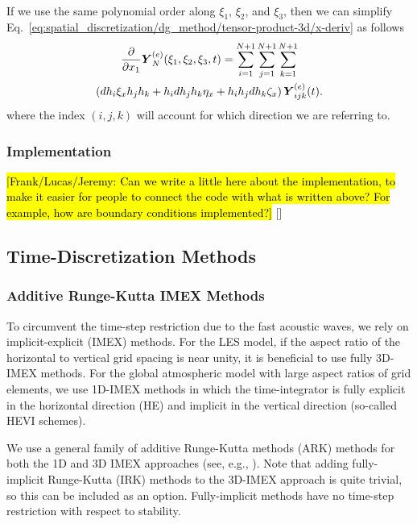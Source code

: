 \documentclass{article}
\begin{document}
{\begin{multline}
\label{eq:spatial_discretization/dg_method/tensor-product-3d/x-deriv}
\end{multline}
If we use the same polynomial order along $\xi_{1}$, $\xi_{2}$, and $\xi_{3}$, then we can simplify Eq.\ \eqref{eq:spatial_discretization/dg_method/tensor-product-3d/x-deriv} as follows
\begin{multline}
\frac{\partial }{\partial x_{1}} \boldsymbol{{Y}}^{(e)}_N(\xi_{1}, \xi_{2}, \xi_{3}, t) = \sum_{i=1}^{N+1} \sum_{j=1}^{N+1} \sum_{k=1}^{N+1} \\
\left( dh_i \xi_x h_j h_k + h_i dh_j h_k \eta_x + h_i h_j dh_k \zeta_x\right) \boldsymbol{{Y}}^{(e)}_{ijk}(t).
\label{eq:spatial_discretization/dg_method/tensor-product-3d/x-deriv2}
\end{multline}
where the index $(i,j,k)$ will account for which direction we are referring to.

\subsubsection{Implementation}

\hl{[Frank/Lucas/Jeremy: Can we write a little here about the implementation, to make it easier for people to connect the code with what is written above? For example, how are boundary conditions implemented?]} 
[]

\subsection{Time-Discretization Methods}\label{s:timestepping}

\subsubsection{Additive Runge-Kutta IMEX Methods}

To circumvent the time-step restriction due to the fast acoustic waves, we rely on implicit-explicit (IMEX) methods. For the LES model, if the aspect ratio of the horizontal to vertical grid spacing is near unity, it is beneficial to use fully 3D-IMEX methods.  For the global atmospheric model with large aspect ratios of grid elements, we use 1D-IMEX methods in which the time-integrator is fully explicit in the horizontal direction (HE) and implicit in the vertical direction (so-called HEVI schemes).

We use a general family of additive Runge-Kutta methods (ARK) methods for both the 1D and 3D IMEX approaches (see, e.g., \citet{giraldo:2013}). Note that adding fully-implicit Runge-Kutta (IRK) methods to the 3D-IMEX approach is quite trivial, so this can be included as an option. Fully-implicit methods have no time-step restriction with respect to stability.

}
\end{document}
